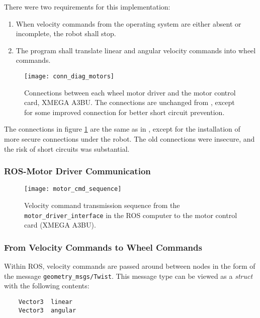 There were two requirements for this implementation: 
\begin{enumerate}
\item When velocity commands from the operating system are either absent or incomplete, the robot shall stop.
\item The program shall translate linear and angular velocity commands into wheel commands.
\end{enumerate}

\begin{figure}[h]
	\centering
	\texttt{[image: conn\_diag\_motors]}
	\caption{Connections between each wheel motor driver and the motor control card, XMEGA A3BU. The connections are unchanged from \cite{aspunvik}, except for some improved connection for better short circuit prevention.}
	\label{fig:conn_diag_motors}
\end{figure}

The connections in figure \ref{fig:conn_diag_motors} are the same as in \cite{aspunvik}, except for the installation of more secure connections under the robot. The old connections were insecure, and the risk of short circuits was substantial.

\subsubsection{ROS-Motor Driver Communication}



\begin{figure}[h]
	\centering
	\texttt{[image: motor\_cmd\_sequence]}
	\caption{Velocity command transmission sequence from the \texttt{motor\_driver\_interface} in the ROS computer to the motor control card (XMEGA A3BU).}
	\label{fig:motor_cmd_sequence}
\end{figure}

\subsubsection{From Velocity Commands to Wheel Commands}

Within \ac{ROS}, velocity commands are passed around between nodes in the form of the message \texttt{geometry\_msgs/Twist}. This message type can be viewed as a \textit{struct} with the following contents:

\begin{verbatim}
	Vector3  linear
	Vector3  angular
\end{verbatim}

